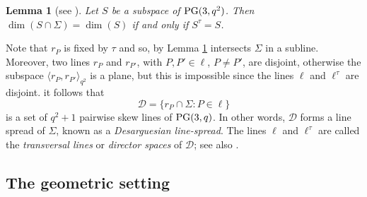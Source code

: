 \documentclass[11pt]{article}
\newtheorem{lemma}[theorem]{Lemma}
\theoremstyle{definition}
\numberwithin{equation}{section}
\def\PG{{\rm PG}}
\begin{document}
\begin{lemma} [see \textnormal{\cite[Lemma 1]{lunardon1999normal}}] \label{lm:subspacesubgeo} Let $S$ be a subspace of $\PG(3,q^2)$. Then $\dim(S \cap \Sigma)=\dim(S)$ if and only if $S^{\tau}=S$. 
\end{lemma}
Note that $r_{P}$ is fixed by $\tau$ and so, by Lemma \ref{lm:subspacesubgeo} intersects $\Sigma$ in a subline. Moreover, two lines $r_P$ and $r_{P'}$, with $P, P' \in \ell$, $P \ne P'$, are disjoint, otherwise the subspace $\langle r_P, r_{P'} \rangle_{q^2}$ is a plane, but this is impossible since the lines $\ell$ and $\ell^{\tau}$ are disjoint. it follows that 
\[
\mathcal{D}=\{r_P \cap \Sigma \colon P \in \ell\}
\]
is a set of $q^2 + 1$ pairwise skew lines of $\PG(3,q)$. In other words, $\mathcal{D}$ forms a line spread of $\Sigma$, known as a \emph{Desarguesian line-spread}. The lines $\ell$ and $\ell^{\tau}$ are called the {\em transversal lines} or \emph{director spaces} of $\mathcal{D}$; see also \cite{lunardon1999normal}.

\subsection{The geometric setting}
\end{document}
